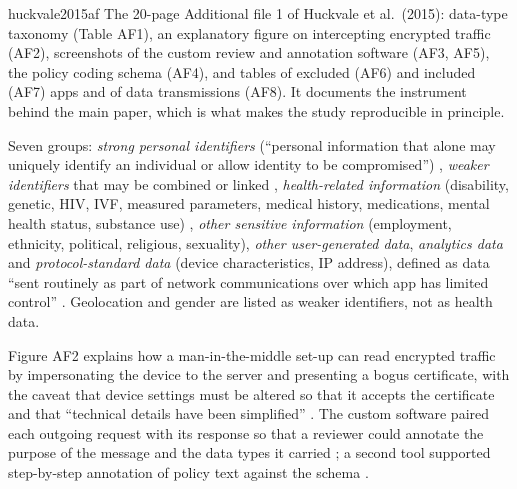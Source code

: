 \begin{papercard}{huckvale2015af}
 The 20-page Additional file 1 of Huckvale et al.\ (2015): data-type taxonomy (Table AF1), an explanatory figure on intercepting encrypted traffic (AF2), screenshots of the custom review and annotation software (AF3, AF5), the policy coding schema (AF4), and tables of excluded (AF6) and included (AF7) apps and of data transmissions (AF8). It documents the instrument behind the main paper, which is what makes the study reproducible in principle.

 Seven groups: \emph{strong personal identifiers} (``personal information that alone may uniquely identify an individual or allow identity to be compromised'') , \emph{weaker identifiers} that may be combined or linked , \emph{health-related information} (disability, genetic, HIV, IVF, measured parameters, medical history, medications, mental health status, substance use) , \emph{other sensitive information} (employment, ethnicity, political, religious, sexuality), \emph{other user-generated data}, \emph{analytics data} and \emph{protocol-standard data} (device characteristics, IP address), defined as data ``sent routinely as part of network communications over which app has limited control'' . Geolocation and gender are listed as weaker identifiers, not as health data.

 Figure AF2 explains how a man-in-the-middle set-up can read encrypted traffic by impersonating the device to the server and presenting a bogus certificate, with the caveat that device settings must be altered so that it accepts the certificate and that ``technical details have been simplified'' . The custom software paired each outgoing request with its response so that a reviewer could annotate the purpose of the message and the data types it carried ; a second tool supported step-by-step annotation of policy text against the schema .


\end{papercard}
